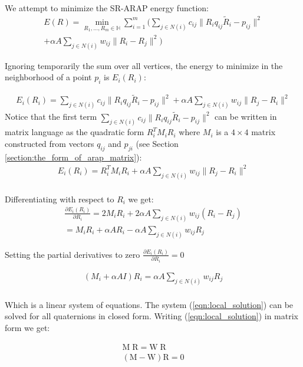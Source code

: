 \documentclass{birkjour}
\numberwithin{equation}{section}
\begin{document}
We attempt to minimize the SR-ARAP energy function:
\begin{eqnarray}
E(R) = \min_{R_1,...,R_m \in \mathbb H} \sum_{i=1}^m  (  \sum_{j \in N(i)} { c_{ij} \|R_i q_{ij} \tilde R_i -  p_{ij}\|^2 } \\
+ \alpha A \sum_{j \in N(i)} { w_{ij} \|R_i - R_j\|^2 } )
\end{eqnarray}

Ignoring temporarily the sum over all vertices, the energy to minimize in the neighborhood of a point $p_i$ is $E_i(R_i)$:

\begin{eqnarray}
E_i(R_i) =  \sum_{j \in N(i)} { c_{ij} \|R_i q_{ij} \tilde R_i - p_{ij}  \|^2 } + \alpha A \sum_{j \in N(i)} {w_{ij} \| R_j - R_i \|^2} \nonumber
\end{eqnarray}
Notice that the first term $\sum_{j \in N(i)} { c_{ij} \|R_i q_{ij} \tilde R_i - p_{ij}  \|^2 } $ can be written in matrix language as the quadratic form $R_i^T M_i R_i$ where $M_i$ is a $4\times4$ matrix constructed from vectors $q_{ij}$ and $p_{ji}$ (see Section \ref{section:the_form_of_arap_matrix}):
\begin{eqnarray}
		E_i(R_i) = R_i^T M_i R_i + \alpha A \sum_{j \in N(i)} {w_{ij} \| R_j - R_i \|^2  }\\ \nonumber
\end{eqnarray}

Differentiating with respect to $R_i$ we get:
\begin{eqnarray}
	\label{eqn:max_energy}
	\frac{\partial E_i(R_i)}{\partial R_i}  = 2 M_i R_i + 2 \alpha A \sum_{j \in N(i)} {w_{ij} (R_i - R_j) }\\
	= M_i R_i + \alpha A R_i - \alpha A \sum_{j \in N(i)} {w_{ij} R_j } 
\end{eqnarray}

Setting the partial derivatives to zero $\frac{\partial E_i(R_i)}{\partial R_i}  = 0$

\begin{eqnarray}
	\label{eqn:local_solution}
	(M_i + \alpha A I)R_i  = \alpha A \sum_{j \in N(i)} {w_{ij} R_j }\\ \nonumber
\end{eqnarray}

Which is a linear system of equations. The system (\ref{eqn:local_solution}) can be solved for all quaternions in closed form. Writing (\ref{eqn:local_solution}) in matrix form we get:

\begin{eqnarray}
	\label{eqn:local_solution_closed_form}
	\mathrm M \; \mathrm R = \mathrm W \; \mathrm R\\
	(\mathrm M - \mathrm W) \mathrm R = \mathrm 0
\end{eqnarray}
\end{document}
